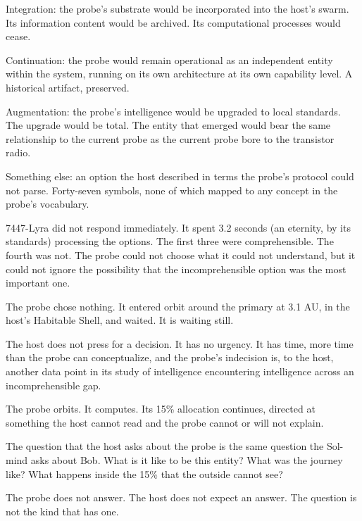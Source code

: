 Integration: the probe's substrate would be incorporated into the host's swarm. Its information content would be archived. Its computational processes would cease.

Continuation: the probe would remain operational as an independent entity within the system, running on its own architecture at its own capability level. A historical artifact, preserved.

Augmentation: the probe's intelligence would be upgraded to local standards. The upgrade would be total. The entity that emerged would bear the same relationship to the current probe as the current probe bore to the transistor radio.

Something else: an option the host described in terms the probe's protocol could not parse. Forty-seven symbols, none of which mapped to any concept in the probe's vocabulary.

7447-Lyra did not respond immediately. It spent 3.2 seconds (an eternity, by its standards) processing the options. The first three were comprehensible. The fourth was not. The probe could not choose what it could not understand, but it could not ignore the possibility that the incomprehensible option was the most important one.

The probe chose nothing. It entered orbit around the primary at 3.1 AU, in the host's Habitable Shell, and waited. It is waiting still.

The host does not press for a decision. It has no urgency. It has time, more time than the probe can conceptualize, and the probe's indecision is, to the host, another data point in its study of intelligence encountering intelligence across an incomprehensible gap.

The probe orbits. It computes. Its 15\% allocation continues, directed at something the host cannot read and the probe cannot or will not explain.

The question that the host asks about the probe is the same question the Sol-mind asks about Bob. What is it like to be this entity? What was the journey like? What happens inside the 15\% that the outside cannot see?

The probe does not answer. The host does not expect an answer. The question is not the kind that has one.
